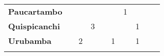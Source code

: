 \begin{tabular}{lccccccccc}
	\textbf{Paucartambo}   & \cellcolor[HTML]{FCC46C}                    & \cellcolor[HTML]{FCC46C}  & \cellcolor[HTML]{FCC46C}                     & \cellcolor[HTML]{FCC46C}                     & \cellcolor[HTML]{FCC46C}                     & \cellcolor[HTML]{FCC46C}1                   & \cellcolor[HTML]{FCC46C}                     & \cellcolor[HTML]{FCC46C}                     & \cellcolor[HTML]{FCC46C} \\
	\textbf{Quispicanchi}  & \cellcolor[HTML]{FCC46C}                    & \cellcolor[HTML]{FCC46C}  & \cellcolor[HTML]{FCC46C}3                    & \cellcolor[HTML]{FCC46C}                     & \cellcolor[HTML]{FCC46C}                     & \cellcolor[HTML]{FCC46C}                    & 1                                            & \cellcolor[HTML]{FCC46C}                     & \cellcolor[HTML]{FCC46C} \\
	\textbf{Urubamba}      & \cellcolor[HTML]{FCC46C}                    & 2                         & \cellcolor[HTML]{FCC46C}                     & \cellcolor[HTML]{FCC46C}                     & 1                                            & \cellcolor[HTML]{FCC46C}                    & 1                                            & \cellcolor[HTML]{FCC46C}                     & \cellcolor[HTML]{FCC46C} \\
	& \multicolumn{1}{l}{}                        & \multicolumn{1}{l}{}      & \multicolumn{1}{l}{}                         & \multicolumn{1}{l}{}                         & \multicolumn{1}{l}{}                         & \multicolumn{1}{l}{}                        & \multicolumn{1}{l}{}                         & \multicolumn{1}{l}{}                         & \multicolumn{1}{l}{}    
\end{tabular}